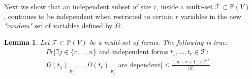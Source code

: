 \documentclass[12pt]{caltech_thesis}
\theoremstyle{plain}
\newtheorem{lemma}{Lemma}
\theoremstyle{definition}
\newcommand{\MT}{\mathcal{T}}
\newcommand{\PP}{\mathbb{P}}
\begin{document}
Next we show that an independent subset of size $r$, 
inside a multi-set $\MT \subset \PP(V)$, continues to be independent when restricted to certain 
$r$ variables in the new \emph{"random"} 
set of variables defined by $\tilde \Omega$.








\begin{lemma}\label{lemma:nondegenracy}
 Let $\MT \subset \PP(V)$ be a multi-set of forms. The following is true:
 \begin{multline}\nonumber
  Pr[ \exists j\in \{r,\ldots,n\} \text{ and independent forms } t_1,\ldots,t_r  \in \MT : \\\Omega(t_1)_{|_{W_j}},\ldots,\Omega(t_r)_{|_{W_j}} \text{ are dependent}] \leq\frac{(n-r+1)r|T|^r}{|S|}	
  \end{multline}
\end{lemma}
\end{document}
